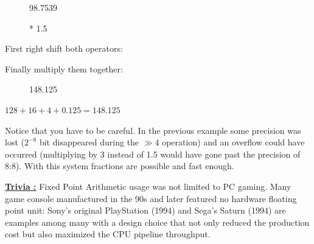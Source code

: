 \par
\begin{figure}[H]
 \centering
   
   \caption{98.7539} 
\end{figure} 
\par
\begin{figure}[H]
 \centering
   
   \caption{* 1.5} 
\end{figure} 
\par
First right shift both operators:\\
\par
\begin{figure}[H]
 \centering
   
\end{figure} 
\par
\begin{figure}[H]
 \centering
   
\end{figure} 
\par

Finally multiply them together:

\begin{figure}[H]
 \centering
   
   \caption{148.125} 
\end{figure} 
$128 + 16 + 4 + 0.125 = 148.125 $


Notice that you have to be careful. In the previous example some precision was lost ($ 2^{-8}$ bit disappeared during the $\gg 4$ operation) and an overflow could have occurred (multiplying by 3 instead of 1.5 would have gone past the precision of 8:8). With this system fractions are possible and fast enough.\\
\par
\begin{minipage}{\textwidth}
 
 \end{minipage}
\par
 \textbf{\underline{Trivia :}}  Fixed Point Arithmetic usage was not limited to PC gaming. Many game console manufactured in the 90s and later featured no hardware floating point unit: Sony's original PlayStation (1994) and Sega's Saturn (1994) are examples among many with a design choice that not only reduced the production cost but also maximized the CPU pipeline throughput.
 

 
 



